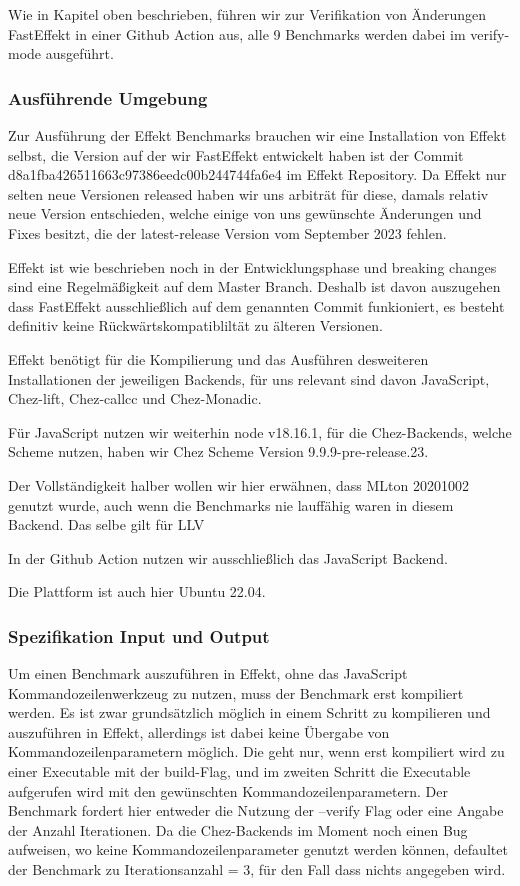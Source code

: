Wie in %
Kapitel oben beschrieben, führen wir zur Verifikation von Änderungen FastEffekt in einer Github Action aus, alle 9 Benchmarks werden dabei im verify-mode ausgeführt. 

\subsubsection{Ausführende Umgebung}
Zur Ausführung der Effekt Benchmarks brauchen wir eine Installation von Effekt selbst, die Version auf der wir FastEffekt entwickelt haben ist der Commit d8a1fba426511663c97386eedc00b244744fa6e4 im Effekt Repository.
Da Effekt nur selten neue Versionen released haben wir uns arbiträt für diese, damals relativ neue Version entschieden, welche einige von uns gewünschte Änderungen und Fixes besitzt, die der latest-release Version vom September 2023 fehlen.

Effekt ist wie beschrieben noch in der Entwicklungsphase und breaking changes sind eine Regelmäßigkeit auf dem Master Branch. Deshalb ist davon auszugehen dass FastEffekt ausschließlich auf dem genannten Commit funkioniert, es besteht definitiv keine Rückwärtskompatibliltät zu älteren Versionen.

Effekt benötigt für die Kompilierung und das Ausführen desweiteren Installationen der jeweiligen Backends, für uns relevant sind davon JavaScript, Chez-lift, Chez-callcc und Chez-Monadic.

Für JavaScript nutzen wir weiterhin node v18.16.1, für die Chez-Backends, welche Scheme nutzen, haben wir Chez Scheme Version 9.9.9-pre-release.23.

Der Vollständigkeit halber wollen wir hier erwähnen, dass MLton 20201002 genutzt wurde, auch wenn die Benchmarks nie lauffähig waren in diesem Backend.
Das selbe gilt für LLV %

In der Github Action nutzen wir ausschließlich das JavaScript Backend.

Die Plattform ist auch hier Ubuntu 22.04.

\subsubsection{Spezifikation Input und Output}
Um einen Benchmark auszuführen in Effekt, ohne das JavaScript Kommandozeilenwerkzeug zu nutzen, muss der Benchmark erst kompiliert werden. Es ist zwar grundsätzlich möglich in einem Schritt zu kompilieren und auszuführen in Effekt, allerdings ist dabei keine Übergabe von Kommandozeilenparametern möglich. Die geht nur, wenn erst kompiliert wird zu einer Executable mit der build-Flag, und im zweiten Schritt die Executable aufgerufen wird mit den gewünschten Kommandozeilenparametern.
Der Benchmark fordert hier entweder die Nutzung der --verify Flag oder eine Angabe der Anzahl Iterationen.
Da die Chez-Backends im Moment noch einen Bug aufweisen, wo keine Kommandozeilenparameter genutzt werden können, defaultet der Benchmark zu Iterationsanzahl = 3, für den Fall dass nichts angegeben wird.

